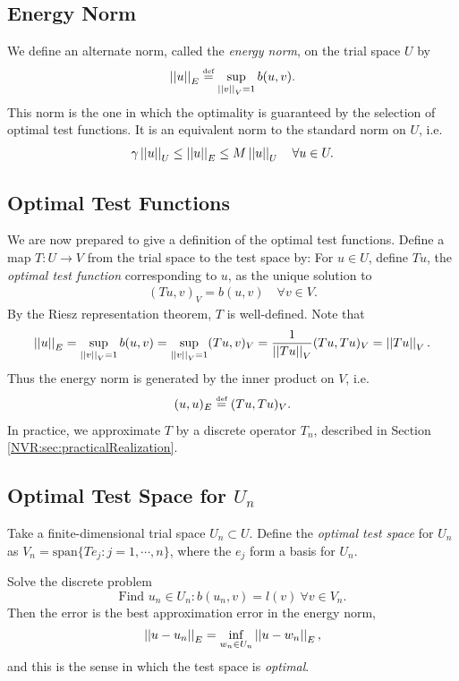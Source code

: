 \subsection{Energy Norm}
We define an alternate norm, called the \emph{energy norm}, on the trial space $U$ by
\begin{equation}\label{NVR:eq:energyNorm}
\norm{u}_{E} \NVReqdef \sup_{\norm{v}_{V}=1} b(u,v).
\end{equation}
This norm is the one in which the optimality is guaranteed by the selection of optimal test functions. It is an equivalent norm to the standard norm on $U$, i.e.\
\begin{equation}
\gamma \norm{u}_{U} \leq \norm{u}_{E} \leq M \norm{u}_{U} \quad \forall u \in U.
\end{equation}

\subsection{Optimal Test Functions}
We are now prepared to give a definition of the optimal test functions.  Define a map $T:U \rightarrow V$ from the trial space to the test space by: For $u \in U$, define $Tu$, the \emph{optimal test function} corresponding to $u$, as the unique solution to 
\begin{align*}
(Tu,v)_{V} = b(u,v) \quad \forall v \in V.
\end{align*}
By the Riesz representation theorem, $T$ is well-defined.  Note that 
\begin{align*}
\norm{u}_{E} = \sup_{\norm{v}_{V}=1} b(u,v) = \sup_{\norm{v}_{V}=1} (Tu,v)_{V} = \frac{1}{\norm{Tu}_{V}} (Tu, Tu)_{V} = \norm{Tu}_{V}.
\end{align*}
Thus the energy norm is generated by the inner product on $V$, i.e.\ 
\begin{equation}
(u,u)_{E} \NVReqdef (Tu,Tu)_{V}.\label{NVR:eq:ipEqualsEnergy}
\end{equation}
In practice, we approximate $T$ by a discrete operator $T_{n}$, described in Section \ref{NVR:sec:practicalRealization}.
\subsection{Optimal Test Space for $U_{n}$}
Take a finite-dimensional trial space $U_{n} \subset U$.  Define the \emph{optimal test space} for $U_{n}$ as $V_{n} = \text{span} \{Te_{j} : j=1,\cdots,n\}$, where the $e_{j}$ form a basis for $U_{n}$.

Solve the discrete problem
\begin{equation}
\text{Find } u_{n} \in U_{n} : b(u_{n}, v) = l(v) \ \forall v \in V_{n}. \label{NVR:eq:discreteAVBVP}
\end{equation}
Then the error is the best approximation error in the energy norm,
\begin{align}
\norm{u-u_{n}}_{E} = \inf_{w_{n} \in U_{n}} \norm{u-w_{n}}_{E},\label{NVR:eq:optimalityEqn}
\end{align}
and this is the sense in which the test space is \emph{optimal}.


